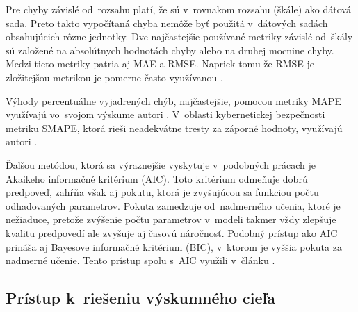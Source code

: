 \documentclass[thesismargins, thesislinespacing, openright, upjsfrontpage]{rnthesis}
\begin{document}
Pre chyby závislé od~rozsahu platí, že sú v~rovnakom rozsahu (škále) ako dátová sada. Preto takto vypočítaná chyba nemôže byť použitá v~dátových sadách obsahujúcich rôzne jednotky. Dve najčastejšie používané metriky závislé od~škály sú založené na absolútnych hodnotách chyby alebo na druhej mocnine chyby. Medzi tieto metriky patria aj MAE a RMSE. Napriek tomu že RMSE je zložitejšou metrikou je pomerne často využívanou \cite{tang2018disclosure,tang2017big,condon2008analysis}. 

Výhody percentuálne vyjadrených chýb, najčastejšie, pomocou metriky MAPE využívajú vo~svojom výskume autori \cite{jiang2004detecting,cortez2012multi,fang2019deep,tang2018disclosure,werner2017time}. V~oblasti kybernetickej bezpečnosti metriku SMAPE, ktorá rieši neadekvátne tresty za záporné hodnoty, využívajú autori \cite{roumani2015time,pokhrel2017cybersecurity}.

Ďalšou metódou, ktorá sa výraznejšie vyskytuje v~podobných prácach \cite{tang2016exploiting,zhan2015predicting,wei2012intrusion} je Akaikeho informačné kritérium (AIC). Toto kritérium odmeňuje dobrú predpoveď, zahŕňa však aj pokutu, ktorá je zvyšujúcou sa funkciou počtu odhadovaných parametrov. Pokuta zamedzuje od~nadmerného učenia, ktoré je nežiaduce, pretože zvýšenie počtu parametrov v~modeli takmer vždy zlepšuje kvalitu predpovedí ale zvyšuje aj časovú náročnosť. Podobný prístup ako AIC prináša aj Bayesove informačné kritérium (BIC), v~ktorom je vyššia pokuta za nadmerné učenie. Tento prístup spolu s~AIC využili v~článku \cite{tang2016exploiting}.


\subsection{Prístup k~riešeniu výskumného cieľa}
 
\end{document}
